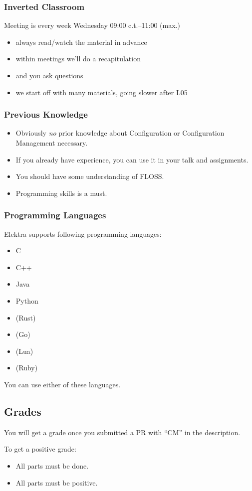 \begin{frame}
	\frametitle{Inverted Classroom}
	Meeting is every week Wednesday 09:00 c.t.--11:00 (max.)

	\begin{itemize}
		\item always read/watch the material in advance
		\item within meetings we'll do a recapitulation
		\item and you ask questions
		\item we start off with many materials, going slower after L05
	\end{itemize}
\end{frame}

\begin{frame}
	\frametitle{Previous Knowledge}
	\begin{itemize}
		\item Obviously \textit{no} prior knowledge about Configuration or Configuration Management necessary.
		\item If you already have experience, you can use it in your talk and assignments.
		\item You should have some understanding of FLOSS.
		\item Programming skills is a must.
	\end{itemize}
\end{frame}

\begin{frame}
	\frametitle{Programming Languages}
	Elektra supports following programming languages:
	\begin{itemize}
		\item C
		\item C++
		\item Java
		\item Python
		\item (Rust)
		\item (Go)
		\item (Lua)
		\item (Ruby)
	\end{itemize}
	You can use either of these languages.
\end{frame}

\subsection{Grades}

\begin{frame}
	You will get a grade once you submitted a PR with ``CM'' in the description.
	\vspace{1cm}

	To get a positive grade:
	\begin{itemize}
		\item All parts must be done.
		\item All parts must be positive.
	\end{itemize}
\end{frame}

